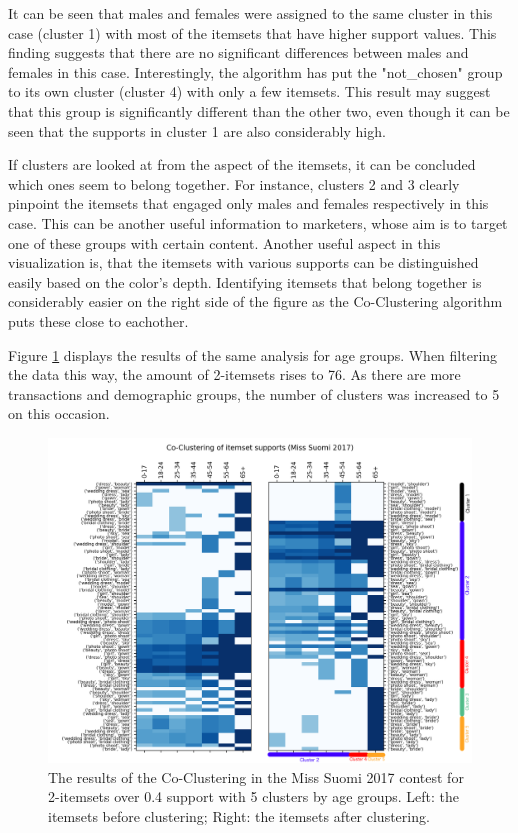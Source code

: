 It can be seen that males and females were assigned to the same cluster in this case (cluster 1) with most of the itemsets that have higher support values. This finding suggests that there are no significant differences between males and females in this case. Interestingly, the algorithm has put the "not\_chosen" group to its own cluster (cluster 4) with only a few itemsets. This result may suggest that this group is significantly different than the other two, even though it can be seen that the supports in cluster 1 are also considerably high. 

If clusters are looked at from the aspect of the itemsets, it can be concluded which ones seem to belong together. For instance, clusters 2 and 3 clearly pinpoint the itemsets that engaged only males and females respectively in this case. This can be another useful information to marketers, whose aim is to target one of these groups with certain content. Another useful aspect in this visualization is, that the itemsets with various supports can be distinguished easily based on the color's depth. Identifying itemsets that belong together is considerably easier on the right side of the figure as the Co-Clustering algorithm puts these close to eachother. 

Figure \ref{coclustering_miss-suomi-age_group-2-itemsets-04_support} displays the results of the same analysis for age groups. When filtering the data this way, the amount of 2-itemsets rises to 76. As there are more transactions and demographic groups, the number of clusters was increased to 5 on this occasion. 

\begin{figure}[h] 
    \begin{center}
        \includegraphics[width=1.0\textwidth]{Images/coclustering_miss-suomi-age_group-2-itemsets-04_support.png}
        \caption{The results of the Co-Clustering in the Miss Suomi 2017 contest for 2-itemsets over 0.4 support with 5 clusters by age groups. Left: the itemsets before clustering; Right: the itemsets after clustering.}
        \label{coclustering_miss-suomi-age_group-2-itemsets-04_support}
    \end{center}
\end{figure}

